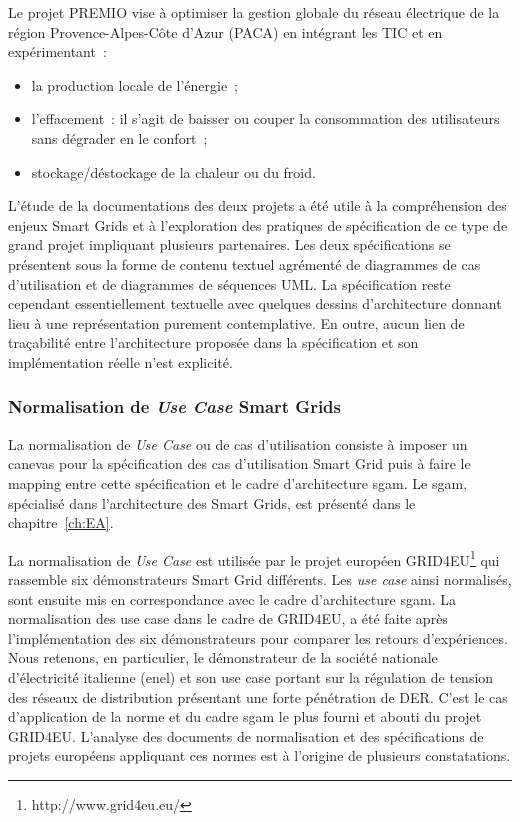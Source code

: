 Le projet PREMIO vise à optimiser la gestion globale du réseau électrique de la
région Provence-Alpes-Côte d'Azur (PACA) en intégrant les TIC et en
expérimentant~:
\begin{itemize}
    \item la production locale de l'énergie~;
    \item l'effacement~: il s'agit de baisser ou couper la consommation des utilisateurs
sans dégrader en le confort~;
    \item stockage/déstockage de la chaleur ou du froid.
\end{itemize}

L'étude de la documentations des deux projets a été utile à la compréhension des
enjeux Smart Grids et à l'exploration des pratiques de spécification de ce type
de grand projet impliquant plusieurs partenaires. Les deux spécifications se
présentent sous la forme de contenu textuel agrémenté de diagrammes de cas
d'utilisation et de diagrammes de séquences UML. La spécification reste
cependant essentiellement textuelle avec quelques dessins d'architecture donnant
lieu à une représentation purement contemplative. En outre, aucun lien de
traçabilité entre l'architecture proposée dans la spécification et son
implémentation réelle n'est explicité.

\subsubsection{Normalisation de \textit{Use Case} Smart Grids}
\label{sec:ENEL}

La normalisation de \textit{Use Case} ou de cas d'utilisation consiste à
imposer un canevas pour la spécification des cas d'utilisation Smart Grid puis à
faire le mapping entre cette spécification et le cadre d'architecture
\gls{sgam}. Le \gls{sgam}, spécialisé dans l'architecture des Smart Grids, est
présenté dans le chapitre~\ref{ch:EA}.

La normalisation de \textit{Use Case} est utilisée par le projet européen
GRID4EU\footnote{http://www.grid4eu.eu/} qui rassemble six démonstrateurs Smart
Grid différents. Les \textit{use case} ainsi normalisés, sont ensuite mis en
correspondance avec le cadre d'architecture \gls{sgam}. La normalisation des use
case dans le cadre de GRID4EU, a été faite après l'implémentation des six
démonstrateurs pour comparer les retours d'expériences. Nous retenons, en
particulier, le démonstrateur de la société nationale d'électricité italienne
(\gls{enel}) et son use case portant sur la régulation de tension des réseaux de
distribution présentant une forte pénétration de DER. C'est le cas d'application
de la norme et du cadre \gls{sgam} le plus fourni et abouti du projet GRID4EU.
L'analyse des documents de normalisation et des spécifications de projets
européens appliquant ces normes est à l'origine de plusieurs constatations.

